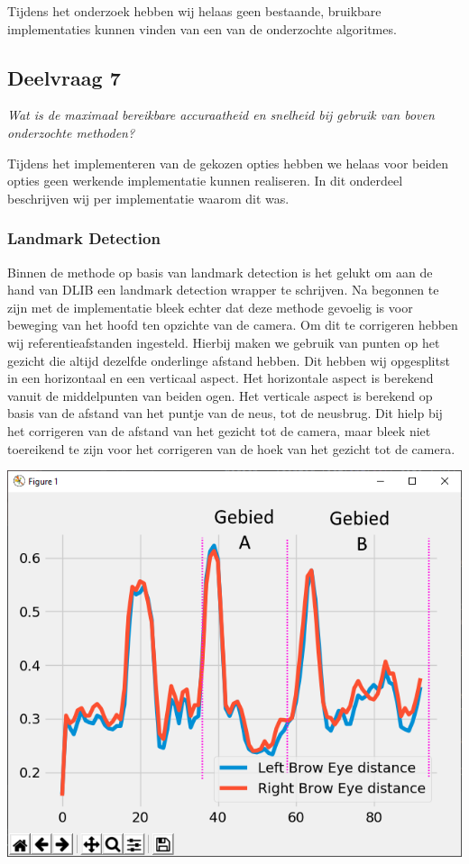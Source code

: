 \documentclass[11pt]{article}
\begin{document}
    Tijdens het onderzoek hebben wij helaas geen bestaande, bruikbare implementaties kunnen vinden van een van de onderzochte algoritmes.

    \subsection{Deelvraag 7}\label{subsec:deelvraag-7}
    \emph{Wat is de maximaal bereikbare accuraatheid en snelheid bij gebruik van boven onderzochte methoden?}

    Tijdens het implementeren van de gekozen opties hebben we helaas voor beiden opties geen werkende implementatie kunnen realiseren.
    In dit onderdeel beschrijven wij per implementatie waarom dit was.

    \subsubsection{Landmark Detection}
    Binnen de methode op basis van landmark detection is het gelukt om aan de hand van DLIB een landmark detection wrapper te schrijven.
    Na begonnen te zijn met de implementatie bleek echter dat deze methode gevoelig is voor beweging van het hoofd ten opzichte van de camera.
    Om dit te corrigeren hebben wij referentieafstanden ingesteld. Hierbij maken we gebruik van punten op het gezicht die altijd dezelfde onderlinge afstand hebben.
    Dit hebben wij opgesplitst in een horizontaal en een verticaal aspect. Het horizontale aspect is berekend vanuit de middelpunten van beiden ogen.
    Het verticale aspect is berekend op basis van de afstand van het puntje van de neus, tot de neusbrug.
    Dit hielp bij het corrigeren van de afstand van het gezicht tot de camera, maar bleek niet toereikend te zijn voor het corrigeren van de hoek van het gezicht tot de camera.

    \vspace{1em}

    \includegraphics[width=0.6\linewidth]{Images/Probleem_landmark.png}
\end{document}
